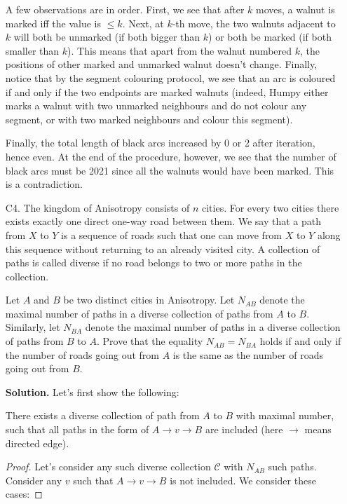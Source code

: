 \documentclass[11pt,a4paper]{article}
\begin{document}
\begin{enumerate}
		A few observations are in order. First, 
		we see that after $k$ moves, a walnut is marked iff the value is $\le k$. 
		Next, at $k$-th move, the two walnuts adjacent to $k$ will both be unmarked (if both bigger than $k$) or both be marked (if both smaller than $k$). 
		This means that apart from the walnut numbered $k$, the positions of other marked and unmarked walnut doesn't change. 
		Finally, notice that by the segment colouring protocol, we see that an arc is coloured if and only if the two endpoints are marked walnuts 
		(indeed, Humpy either marks a walnut with two unmarked neighbours and do not colour any segment, 
		or with two marked neighbours and colour this segment). 
		
		Finally, the total length of black arcs increased by 0 or 2 after iteration, 
		hence even. At the end of the procedure, however, we see that the number of black arcs must be 2021 since all the walnuts would have been marked. 
		This is a contradiction. 
		
		\item [C4.] 
		The kingdom of Anisotropy consists of $n$ cities. For every two cities there exists exactly one direct one-way road between them. We say that a path from $X$ to $Y$ is a sequence of roads such that one can move from $X$ to $Y$ along this sequence without returning to an already visited city. A collection of paths is called diverse if no road belongs to two or more paths in the collection.
		
		Let $A$ and $B$ be two distinct cities in Anisotropy. Let $N_{AB}$ denote the maximal number of paths in a diverse collection of paths from $A$ to $B$. Similarly, let $N_{BA}$ denote the maximal number of paths in a diverse collection of paths from $B$ to $A$. Prove that the equality $N_{AB} = N_{BA}$ holds if and only if the number of roads going out from $A$ is the same as the number of roads going out from $B$.
		
		\textbf{Solution.} 
		Let's first show the following: 
		\begin{lemma}
			\label{lemma_c4a}
			There exists a diverse collection of path from $A$ to $B$ with maximal number, 
			such that all paths in the form of $A\to v\to B$ are included (here $\to$ means directed edge). 
		\end{lemma}
		
		\begin{proof}
			Let's consider any such diverse collection $\mathcal{C}$ with $N_{AB}$ such paths. 
			Consider any $v$ such that $A\to v\to B$ is not included. We consider these cases: 
			

\end{proof}
\end{enumerate}
\end{document}
